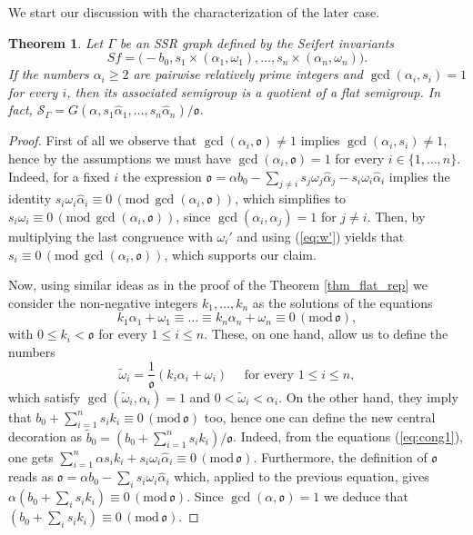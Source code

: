 \documentclass[oneside]{amsart}
\numberwithin{equation}{section}
\numberwithin{equation}{subsection}
\theoremstyle{plain}
\newtheorem{thm}[equation]{Theorem}
\theoremstyle{definition}
\newcommand{\w}{\omega}
\newcommand{\al}{\alpha}
\newcommand{\Se}{\mathcal{S}}
\newcommand{\G}{\Gamma}
\newcommand{\oo}{\mathfrak{o}}
\begin{document}
We start our discussion with the characterization of the later case.

\begin{thm}
     \label{flat:divisor}
     Let $\G$ be an SSR  graph defined by the Seifert invariants   
     \[
         Sf=\big(-b_0,s_1\times(\al_1,\w_1),\dots,s_n\times(\al_n,\w_n)
         \big) .    
     \]
     If the numbers $\al_i\geq 2$  are pairwise relatively prime integers and $\gcd(\al_i,s_i)=1$ for every  $i$,
     then its associated semigroup is a quotient of a flat semigroup.
     In fact,
     $\Se_{\G}=G(\al,s_1 \widehat{\al}_1,\dots,s_n\widehat{\al}_n)/\oo$.
 \end{thm}
 \begin{proof}
 First of all we observe that $\gcd(\al_i,\oo)\neq 1$ implies $\gcd(\al_i,s_i)\neq 1$, hence by the assumptions we must have $\gcd(\al_i,\oo)=1$ for every $i\in\{1,\dots,n\}$. Indeed, for a fixed $i$ the expression $\oo=\al b_0-\sum_{j\neq i}s_j\w_j\widehat{\al}_j - s_i\w_i\widehat{\al}_i$ implies the identity $s_i\w_i\widehat{\al}_i\equiv 0\,(\mathrm{mod }\,{\gcd(\al_i,\oo)})$, which simplifies to $s_i\w_i\equiv 0\,(\mathrm{mod }\,{\gcd(\al_i,\oo)})$, since $\gcd(\al_i,\al_j)=1$ for $j\neq i$. Then, by multiplying the last congruence with $\w_i'$ and using (\ref{eq:w'}) yields that $s_i\equiv 0\,(\mathrm{mod }\,{\gcd(\al_i,\oo)})$, which supports our claim. 
 
 
    Now, using similar ideas as in the proof of the Theorem \ref{thm_flat_rep} we consider the non-negative integers $k_1,\dots,k_n$ as the solutions of the equations
     \begin{equation}\label{eq:cong1}
      k_1 \al_1+\w_1\equiv
     \dots\equiv k_n \al_n+\w_n\equiv 0\,(\mathrm{mod }\,{\oo}),    
     \end{equation}
     with $0\leq k_i< \oo$ for every $1\le i\le n$. 
     These, on one hand, allow us to define the numbers 
     \[
        \tilde{\w}_i=\frac{1}{\oo} (k_i\al_i+\w_i)\quad
        \mbox{ for every }  1\le i\le n,
     \]
     which satisfy $\gcd(\tilde{\w}_i,\al_i)=1$ and $0<\tilde{\w}_i<\al_i$. 
     On the other hand, they imply that $b_0+\sum_{i=1}^ns_ik_i \equiv 0\,(\mathrm{mod }\,{\oo})$ too, hence one can define the new central  decoration as $\tilde{b}_0=(b_0+\sum_{i=1}^ns_ik_i)/\oo$. Indeed, from the equations (\ref{eq:cong1}), one gets $\sum_{i=1}^n\al s_i k_i +s_i\w_i\widehat{\al}_i\equiv 0\,(\mathrm{mod }\,{\oo})$. Furthermore,  the definition of $\oo$ reads as $\oo=\al b_0-\sum_i s_i\w_i\widehat{\al}_i$ which,  applied to the previous equation,  gives $\al(b_0+\sum_i s_i k_i) \equiv 0\,(\mathrm{mod }\,{\oo})$.  Since $\gcd(\al,\oo)=1$ we deduce that  $(b_0+\sum_i s_i k_i) \equiv 0\,(\mathrm{mod }\,{\oo})$.
     

\end{proof}
\end{document}
